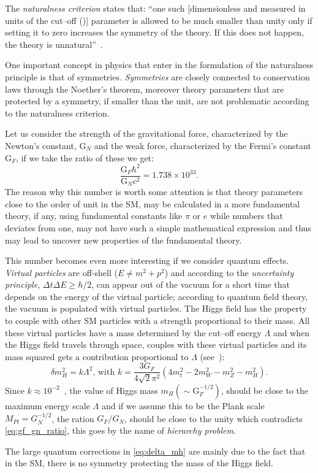 The \emph{naturalness criterion} states that: ``one such [dimensionless and
measured in units of the cut--off (\Lambda)] parameter is allowed to be much
smaller than unity only if setting it to zero increases the symmetry of the
theory. If this does not happen, the theory is unnatural''~\cite{thooft:gauge}.

One important concept in physics that enter in the formulation of the
naturalness principle is that of symmetries. \emph{Symmetries} are closely
connected to conservation laws through the Noether's theorem, moreover theory
parameters that are protected by a symmetry, if smaller than the unit, are not
problematic according to the naturalness criterion.

Let us consider the strength of the gravitational force, characterized by the
Newton's constant, G$_N$ and the weak force, characterized by the Fermi's
constant G$_F$, if we take the ratio of these we get:
\begin{equation}
  \label{eq:gf_gn_ratio}
  \frac{\mathrm{G}_F \hbar^2}{\mathrm{G}_N c^2} = 1.738 \times 10^{33}.
\end{equation}
The reason why this number is worth some attention is that theory parameters
close to the order of unit in the SM, may be calculated in a more fundamental
theory, if any, using fundamental constants like $\pi$ or $e$ while numbers that
deviates from one, may not have such a simple mathematical expression and thus
may lead to uncover new properties of the fundamental theory.

This number becomes even more interesting if we consider quantum effects.
\emph{Virtual particles} are off-shell ($E \neq m^2 + p^2$) and according to the
\emph{uncertainty principle}, $\Delta t \Delta E \geq \hbar / 2$, can appear out
of the vacuum for a short time that depends on the energy of the virtual
particle; according to quantum field theory, the vacuum is populated with
virtual particles. The Higgs field has the property to couple with other SM
particles with a strength proportional to their mass. All these virtual
particles have a mass determined by the cut--off energy $\Lambda$ and when the
Higgs field travels through space, couples with these virtual particles and its
mass squared gets a contribution proportional to $\Lambda$
(see~\cite{Giudice:2008bi}):
\begin{equation}
  \label{eq:delta_mh}
  \delta m_H^2 = k \Lambda^2 \text{, with } k = \frac{3 G_F}{4 \sqrt{2}
    \pi^2}(4m_t^2 - 2m_W^2 - m_Z^2 - m_H^2).
\end{equation}
Since $k \approx 10^{-2}$~\cite{Giudice:2008bi}, the value of Higgs mass
$m_H (\sim \mathrm{G}_F^{-1/2})$, should be close to the maximum energy scale
$\Lambda$ and if we assume this to be the Plank scale $M_{Pl} = G_N^{-1/2}$, the
ration $G_F/G_N$, should be close to the unity which contradicts
\cref{eq:gf_gn_ratio}, this goes by the name of \emph{hierarchy problem}.

The large quantum corrections in \cref{eq:delta_mh} are mainly due to the fact
that in the SM, there is no symmetry protecting the mass of the Higgs field.

